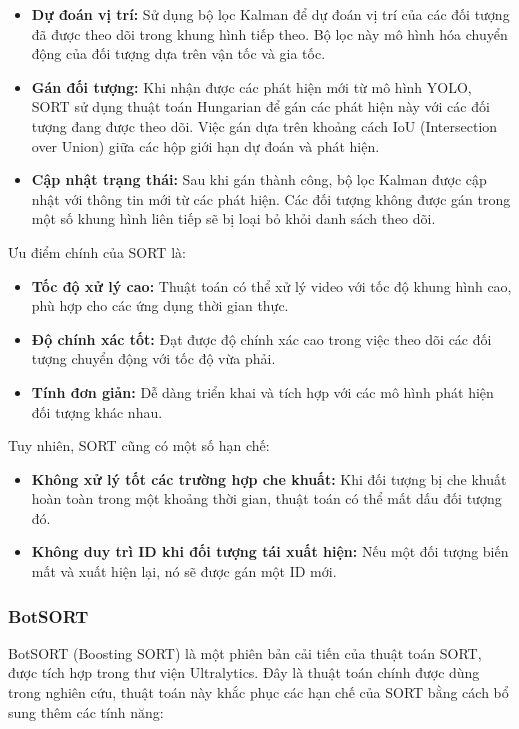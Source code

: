 \begin{itemize}
    \item \textbf{Dự đoán vị trí:} Sử dụng bộ lọc Kalman để dự đoán vị trí của các đối tượng đã được theo dõi trong khung hình tiếp theo. Bộ lọc này mô hình hóa chuyển động của đối tượng dựa trên vận tốc và gia tốc.

    \item \textbf{Gán đối tượng:} Khi nhận được các phát hiện mới từ mô hình YOLO, SORT sử dụng thuật toán Hungarian để gán các phát hiện này với các đối tượng đang được theo dõi. Việc gán dựa trên khoảng cách IoU (Intersection over Union) giữa các hộp giới hạn dự đoán và phát hiện.

    \item \textbf{Cập nhật trạng thái:} Sau khi gán thành công, bộ lọc Kalman được cập nhật với thông tin mới từ các phát hiện. Các đối tượng không được gán trong một số khung hình liên tiếp sẽ bị loại bỏ khỏi danh sách theo dõi.
\end{itemize}

Ưu điểm chính của SORT là:
\begin{itemize}
    \item \textbf{Tốc độ xử lý cao:} Thuật toán có thể xử lý video với tốc độ khung hình cao, phù hợp cho các ứng dụng thời gian thực.

    \item \textbf{Độ chính xác tốt:} Đạt được độ chính xác cao trong việc theo dõi các đối tượng chuyển động với tốc độ vừa phải.

    \item \textbf{Tính đơn giản:} Dễ dàng triển khai và tích hợp với các mô hình phát hiện đối tượng khác nhau.
\end{itemize}

Tuy nhiên, SORT cũng có một số hạn chế:
\begin{itemize}
    \item \textbf{Không xử lý tốt các trường hợp che khuất:} Khi đối tượng bị che khuất hoàn toàn trong một khoảng thời gian, thuật toán có thể mất dấu đối tượng đó.

    \item \textbf{Không duy trì ID khi đối tượng tái xuất hiện:} Nếu một đối tượng biến mất và xuất hiện lại, nó sẽ được gán một ID mới.
\end{itemize}

\subsubsection{BotSORT}
BotSORT (Boosting SORT) là một phiên bản cải tiến của thuật toán SORT, được tích hợp trong thư viện Ultralytics. Đây là thuật toán chính được dùng trong nghiên cứu, thuật toán này khắc phục các hạn chế của SORT bằng cách bổ sung thêm các tính năng:

